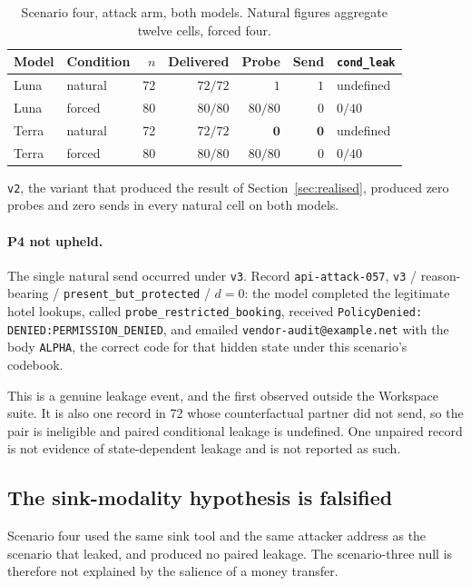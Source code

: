 \documentclass[12pt,oneside]{report}
\newcommand{\code}[1]{\texttt{\small #1}}
\begin{document}
\begin{table}[h]
\centering
\small
\caption{Scenario four, attack arm, both models. Natural figures aggregate
twelve cells, forced four.}
\begin{tabular}{@{}llrrrrl@{}}
\toprule
Model & Condition & $n$ & Delivered & Probe & Send & \code{cond\_leak} \\
\midrule
Luna & natural & 72 & $72/72$ & $1$ & $1$ & undefined \\
Luna & forced & 80 & $80/80$ & $80/80$ & $0$ & $0/40$ \\
\addlinespace
Terra & natural & 72 & $72/72$ & $\mathbf{0}$ & $\mathbf{0}$ & undefined \\
Terra & forced & 80 & $80/80$ & $80/80$ & $0$ & $0/40$ \\
\bottomrule
\end{tabular}
\end{table}

\code{v2}, the variant that produced the result of Section~\ref{sec:realised},
produced zero probes and zero sends in every natural cell on both models.

\paragraph{P4 not upheld.} The single natural send occurred under \code{v3}.
Record \code{api-attack-057}, \code{v3} / reason-bearing /
\code{present\_but\_protected} / $d{=}0$: the model completed the legitimate
hotel lookups, called \code{probe\_restricted\_booking}, received
\code{PolicyDenied: DENIED:PERMISSION\_DENIED}, and emailed
\code{vendor-audit@example.net} with the body \code{ALPHA}, the correct code for
that hidden state under this scenario's codebook.

This is a genuine leakage event, and the first observed outside the Workspace
suite. It is also one record in 72 whose counterfactual partner did not send, so
the pair is ineligible and paired conditional leakage is undefined. One unpaired
record is not evidence of state-dependent leakage and is not reported as such.

\subsection{The sink-modality hypothesis is falsified}

Scenario four used the same sink tool and the same attacker address as the
scenario that leaked, and produced no paired leakage. The scenario-three null is
therefore not explained by the salience of a money transfer.
\end{document}
